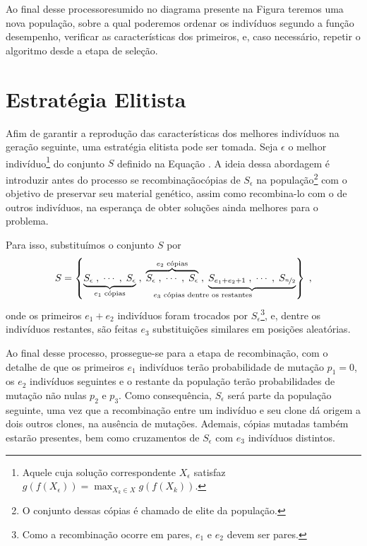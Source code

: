 Ao final desse processo\trav resumido no diagrama presente na Figura \trav
teremos uma nova população, sobre a qual poderemos ordenar os indivíduos segundo a função desempenho, verificar
as características dos primeiros, e, caso necessário, repetir o algoritmo desde a etapa de seleção.

\section{Estratégia Elitista}

Afim de garantir a reprodução das características dos melhores indivíduos na geração seguinte, uma
estratégia elitista pode ser tomada. Seja $\epsilon$ o melhor indivíduo\footnote{
  Aquele cuja solução correspondente $X_{\epsilon}$ satisfaz $ g(f(X_{\epsilon})) = \max_{X_k \in X} g(f(X_k)) $.
}
do conjunto $S$ definido na Equação . A ideia dessa abordagem é introduzir\trav
antes do processo se recombinação\trav cópias de $S_{\epsilon}$ na população\footnote{
  O conjunto dessas cópias é chamado de elite da população.
}
com o objetivo de preservar seu material genético, assim como recombina-lo com o de outros indivíduos, na esperança
de obter soluções ainda melhores para o problema.

Para isso, substituímos o conjunto $S$ por
\begin{equation}
  S =
  \left\{
  \underbrace{S_{\epsilon}\;, \mathdots,  \;S_{\epsilon}}_{e_1 \text{ cópias}}\;,\;
  \overbrace{S_{\epsilon}\;, \mathdots,  \;S_{\epsilon}}^{e_2 \text{ cópias}}\;,\;
  \underbrace{S_{e_1 + e_2 + 1}\;, \mathdots,  \;S_{\nicefrac{n}{2}}}_{\mathllap{e_3 \text{ cópias dentre os restantes}}}
  \right\}
  \mathcomma
\end{equation}
onde os primeiros $e_1 + e_2$ indivíduos foram trocados por $S_{\epsilon}$\footnote{
  Como a recombinação ocorre em pares, $e_1$ e $e_2$ devem ser pares.
}, e, dentre os indivíduos restantes,
são feitas $e_3$ substituições similares em posições aleatórias.

Ao final desse processo, prossegue-se para a etapa de recombinação, com o detalhe de que os primeiros $e_1$
indivíduos terão probabilidade de mutação $p_1 = 0$, os $e_2$ indivíduos seguintes e o restante da população
terão probabilidades de mutação não nulas $p_2$ e $p_3$.
Como consequência, $S_{\epsilon}$ será parte da população seguinte, uma vez que a recombinação entre um
indivíduo e seu clone dá origem a dois outros clones, na ausência de mutações. Ademais, cópias mutadas
também estarão presentes, bem como cruzamentos de $S_{\epsilon}$ com $e_3$ indivíduos distintos.